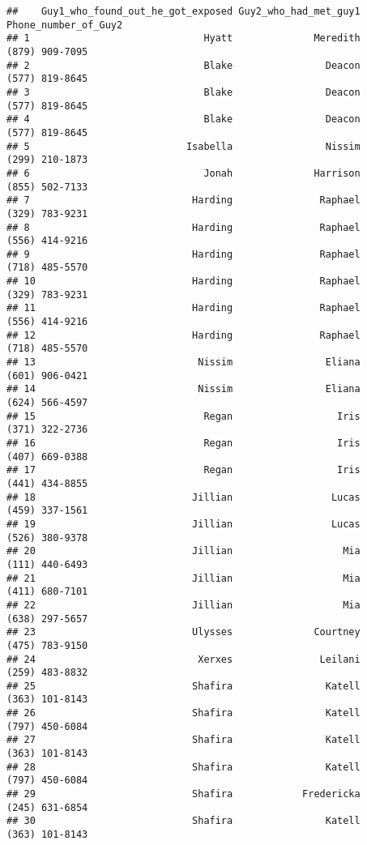 \documentclass[
]{article}
\begin{document}
\begin{verbatim}
##    Guy1_who_found_out_he_got_exposed Guy2_who_had_met_guy1 Phone_number_of_Guy2
## 1                              Hyatt              Meredith       (879) 909-7095
## 2                              Blake                Deacon       (577) 819-8645
## 3                              Blake                Deacon       (577) 819-8645
## 4                              Blake                Deacon       (577) 819-8645
## 5                           Isabella                Nissim       (299) 210-1873
## 6                              Jonah              Harrison       (855) 502-7133
## 7                            Harding               Raphael       (329) 783-9231
## 8                            Harding               Raphael       (556) 414-9216
## 9                            Harding               Raphael       (718) 485-5570
## 10                           Harding               Raphael       (329) 783-9231
## 11                           Harding               Raphael       (556) 414-9216
## 12                           Harding               Raphael       (718) 485-5570
## 13                            Nissim                Eliana       (601) 906-0421
## 14                            Nissim                Eliana       (624) 566-4597
## 15                             Regan                  Iris       (371) 322-2736
## 16                             Regan                  Iris       (407) 669-0388
## 17                             Regan                  Iris       (441) 434-8855
## 18                           Jillian                 Lucas       (459) 337-1561
## 19                           Jillian                 Lucas       (526) 380-9378
## 20                           Jillian                   Mia       (111) 440-6493
## 21                           Jillian                   Mia       (411) 680-7101
## 22                           Jillian                   Mia       (638) 297-5657
## 23                           Ulysses              Courtney       (475) 783-9150
## 24                            Xerxes               Leilani       (259) 483-8832
## 25                           Shafira                Katell       (363) 101-8143
## 26                           Shafira                Katell       (797) 450-6084
## 27                           Shafira                Katell       (363) 101-8143
## 28                           Shafira                Katell       (797) 450-6084
## 29                           Shafira            Fredericka       (245) 631-6854
## 30                           Shafira                Katell       (363) 101-8143

\end{verbatim}
\end{document}

